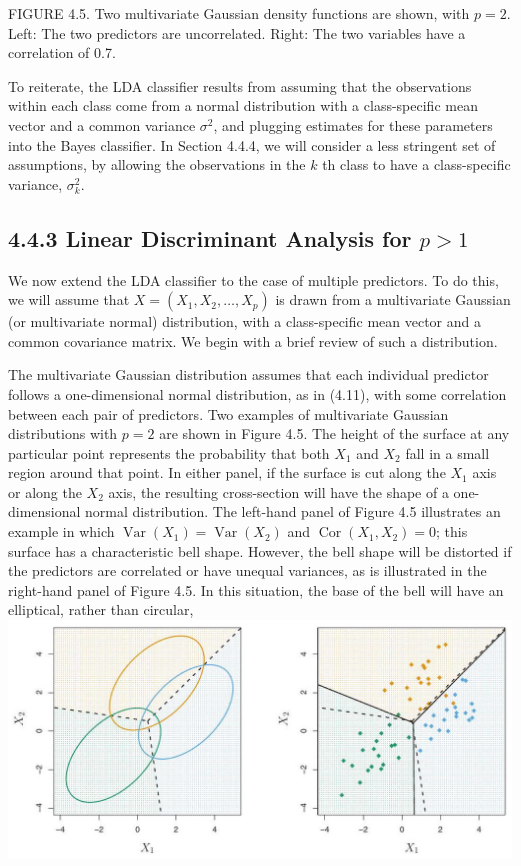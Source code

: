 \documentclass[10pt]{article}
\begin{document}
FIGURE 4.5. Two multivariate Gaussian density functions are shown, with $p=2$. Left: The two predictors are uncorrelated. Right: The two variables have a correlation of 0.7.

To reiterate, the LDA classifier results from assuming that the observations within each class come from a normal distribution with a class-specific mean vector and a common variance $\sigma^{2}$, and plugging estimates for these parameters into the Bayes classifier. In Section 4.4.4, we will consider a less stringent set of assumptions, by allowing the observations in the $k$ th class to have a class-specific variance, $\sigma_{k}^{2}$.

\subsection*{4.4.3 Linear Discriminant Analysis for $p>1$}
We now extend the LDA classifier to the case of multiple predictors. To do this, we will assume that $X=\left(X_{1}, X_{2}, \ldots, X_{p}\right)$ is drawn from a multivariate Gaussian (or multivariate normal) distribution, with a class-specific mean vector and a common covariance matrix. We begin with a brief review of such a distribution.

The multivariate Gaussian distribution assumes that each individual predictor follows a one-dimensional normal distribution, as in (4.11), with some correlation between each pair of predictors. Two examples of multivariate Gaussian distributions with $p=2$ are shown in Figure 4.5. The height of the surface at any particular point represents the probability that both $X_{1}$ and $X_{2}$ fall in a small region around that point. In either panel, if the surface is cut along the $X_{1}$ axis or along the $X_{2}$ axis, the resulting cross-section will have the shape of a one-dimensional normal distribution. The left-hand panel of Figure 4.5 illustrates an example in which $\operatorname{Var}\left(X_{1}\right)=\operatorname{Var}\left(X_{2}\right)$ and $\operatorname{Cor}\left(X_{1}, X_{2}\right)=0$; this surface has a characteristic bell shape. However, the bell shape will be distorted if the predictors are correlated or have unequal variances, as is illustrated in the right-hand panel of Figure 4.5. In this situation, the base of the bell will have an elliptical, rather than circular,\\
\includegraphics[max width=\textwidth, center]{2025_05_05_efe77898333945044de4g-158}
\end{document}
